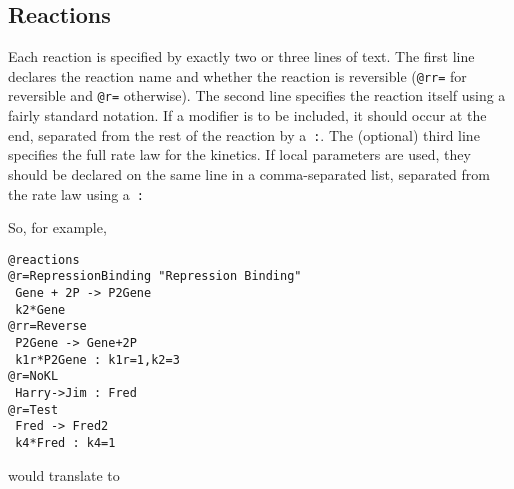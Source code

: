 \documentclass[11pt,a4paper]{article}
\begin{document}
\subsection{Reactions}

Each reaction is specified by exactly two or three lines of text. The first
line declares the reaction name and whether the reaction is reversible
(\verb$@rr=$ for reversible and \verb$@r=$ otherwise). The second line
specifies the reaction itself using a fairly standard notation. If a
modifier is to be included, it should occur at the end, separated from
the rest of the reaction by a~\verb$:$. The (optional)
third line specifies the full rate law for the kinetics. If local
parameters are used, they should be declared on the same line in a
comma-separated list, separated from the rate law using a~\verb$:$

So, for example,

{\small
\begin{verbatim}
@reactions
@r=RepressionBinding "Repression Binding"
 Gene + 2P -> P2Gene
 k2*Gene
@rr=Reverse
 P2Gene -> Gene+2P
 k1r*P2Gene : k1r=1,k2=3
@r=NoKL
 Harry->Jim : Fred
@r=Test
 Fred -> Fred2
 k4*Fred : k4=1

\end{verbatim}}

\noindent would translate to
\end{document}
